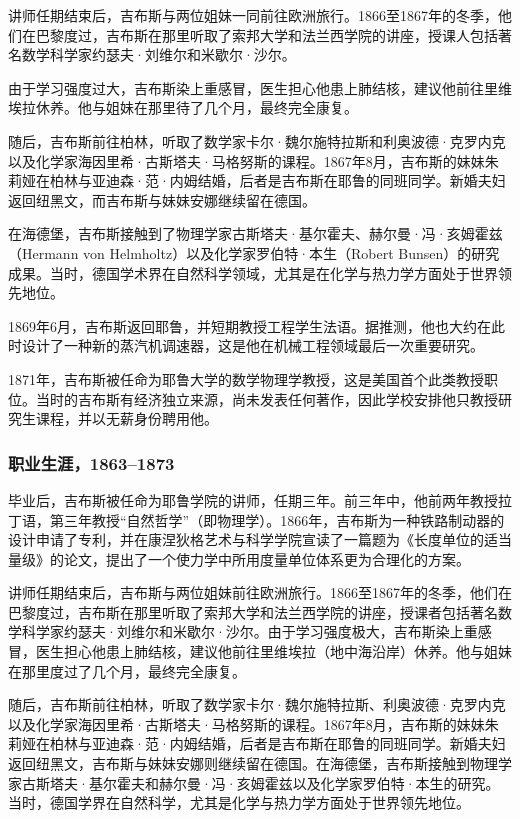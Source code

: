 讲师任期结束后，吉布斯与两位姐妹一同前往欧洲旅行。1866至1867年的冬季，他们在巴黎度过，吉布斯在那里听取了索邦大学和法兰西学院的讲座，授课人包括著名数学科学家约瑟夫·刘维尔和米歇尔·沙尔。

由于学习强度过大，吉布斯染上重感冒，医生担心他患上肺结核，建议他前往里维埃拉休养。他与姐妹在那里待了几个月，最终完全康复。

随后，吉布斯前往柏林，听取了数学家卡尔·魏尔施特拉斯和利奥波德·克罗内克以及化学家海因里希·古斯塔夫·马格努斯的课程。1867年8月，吉布斯的妹妹朱莉娅在柏林与亚迪森·范·内姆结婚，后者是吉布斯在耶鲁的同班同学。新婚夫妇返回纽黑文，而吉布斯与妹妹安娜继续留在德国。

在海德堡，吉布斯接触到了物理学家古斯塔夫·基尔霍夫、赫尔曼·冯·亥姆霍兹（Hermann von Helmholtz）以及化学家罗伯特·本生（Robert Bunsen）的研究成果。当时，德国学术界在自然科学领域，尤其是在化学与热力学方面处于世界领先地位。

1869年6月，吉布斯返回耶鲁，并短期教授工程学生法语。据推测，他也大约在此时设计了一种新的蒸汽机调速器，这是他在机械工程领域最后一次重要研究。

1871年，吉布斯被任命为耶鲁大学的数学物理学教授，这是美国首个此类教授职位。当时的吉布斯有经济独立来源，尚未发表任何著作，因此学校安排他只教授研究生课程，并以无薪身份聘用他。
\subsubsection{职业生涯，1863–1873}
毕业后，吉布斯被任命为耶鲁学院的讲师，任期三年。前三年中，他前两年教授拉丁语，第三年教授“自然哲学”（即物理学）。1866年，吉布斯为一种铁路制动器的设计申请了专利，并在康涅狄格艺术与科学学院宣读了一篇题为《长度单位的适当量级》的论文，提出了一个使力学中所用度量单位体系更为合理化的方案。

讲师任期结束后，吉布斯与两位姐妹前往欧洲旅行。1866至1867年的冬季，他们在巴黎度过，吉布斯在那里听取了索邦大学和法兰西学院的讲座，授课者包括著名数学科学家约瑟夫·刘维尔和米歇尔·沙尔。由于学习强度极大，吉布斯染上重感冒，医生担心他患上肺结核，建议他前往里维埃拉（地中海沿岸）休养。他与姐妹在那里度过了几个月，最终完全康复。

随后，吉布斯前往柏林，听取了数学家卡尔·魏尔施特拉斯、利奥波德·克罗内克以及化学家海因里希·古斯塔夫·马格努斯的课程。1867年8月，吉布斯的妹妹朱莉娅在柏林与亚迪森·范·内姆结婚，后者是吉布斯在耶鲁的同班同学。新婚夫妇返回纽黑文，吉布斯与妹妹安娜则继续留在德国。在海德堡，吉布斯接触到物理学家古斯塔夫·基尔霍夫和赫尔曼·冯·亥姆霍兹以及化学家罗伯特·本生的研究。当时，德国学界在自然科学，尤其是化学与热力学方面处于世界领先地位。

